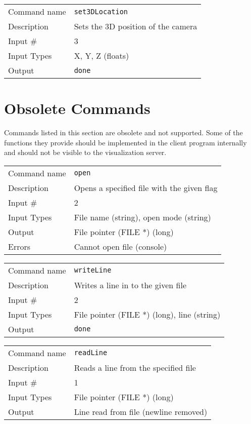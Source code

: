\bigskip

\noindent
\begin{tabular}{l|p{5in}}
\hline
Command name & {\tt set3DLocation} \\
Description  & Sets the 3D position of the camera \\
Input \#     & 3 \\
Input Types  & X, Y, Z (floats) \\
Output       & {\tt done} \\
\hline
\end{tabular}

\section{Obsolete Commands}

Commands listed in this section are obsolete and not supported. Some
of the functions they provide should be implemented in the client
program internally and should not be visible to the visualization
server.

\bigskip

\noindent
\begin{tabular}{l|p{5in}}
\hline
Command name & {\tt open} \\
Description  & Opens a specified file with the given flag \\
Input \#     & 2 \\
Input Types  & File name (string), open mode (string) \\
Output       & File pointer (FILE *) (long) \\
Errors       & Cannot open file (console) \\
\hline
\end{tabular}

\bigskip

\noindent
\begin{tabular}{l|p{5in}}
\hline
Command name & {\tt writeLine} \\
Description  & Writes a line in to the given file \\
Input \#     & 2 \\
Input Types  & File pointer (FILE *) (long), line (string) \\
Output       & {\tt done} \\
\hline
\end{tabular}

\bigskip

\noindent
\begin{tabular}{l|p{5in}}
\hline
Command name & {\tt readLine} \\
Description  & Reads a line from the specified file \\
Input \#     & 1 \\
Input Types  & File pointer (FILE *) (long) \\
Output       & Line read from file (newline removed) \\
\hline
\end{tabular}

